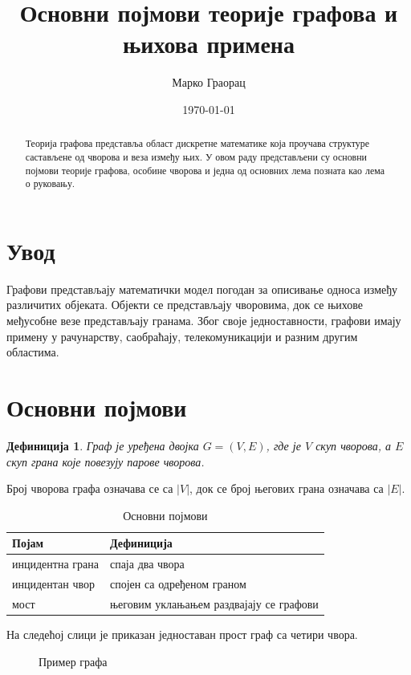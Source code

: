 \documentclass[12pt,a4paper]{article}
\title{\textbf{Основни појмови теорије графова и њихова примена}}
\author{Марко Граорац}
\date{\today}
\newtheorem{definicija}{Дефиниција}[section]
\begin{document}
\begin{abstract}
Теорија графова представља област дискретне математике која проучава
структуре састављене од чворова и веза између њих. У овом раду представљени су основни појмови теорије графова, особине чворова и једна од основних лема позната као лема о руковању.
\end{abstract}

\section{Увод}

Графови представљају математички модел погодан за описивање односа између
различитих објеката. Објекти се представљају чворовима, док се
њихове међусобне везе представљају гранама. Због своје једноставности,
графови имају примену у рачунарству, саобраћају, телекомуникацији и
разним другим областима.

\section{Основни појмови}

\begin{definicija}
Граф је уређена двојка $G=(V,E)$, где је $V$ скуп чворова, а $E$ скуп
грана које повезују парове чворова.
\end{definicija}

Број чворова графа означава се са $|V|$, док се број његових грана
означава са $|E|$.

\begin{table}[h]
\centering
\caption{Основни појмови}
\begin{tabular}{ll}
\toprule
\textbf{Појам} & \textbf{Дефиниција} \\
\midrule
инцидентна грана & спаја два чвора \\
инцидентан чвор & спојен са одређеном граном \\
мост & његовим уклањањем раздвајају се графови \\
\bottomrule
\end{tabular}
\label{tab:vrste-grafova}
\end{table}

На следећој слици је приказан једноставан прост граф са четири чвора.

\begin{figure}
\centering
{}
\caption{Пример графа}
\label{fig:graf}
\end{figure}
\end{document}
